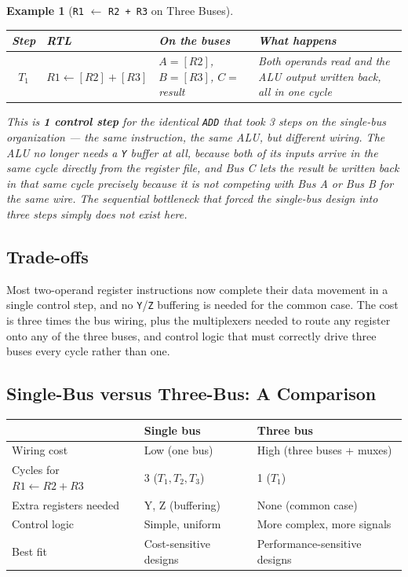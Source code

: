 \documentclass[11pt]{article}
\newtheorem{example}{Example}[section]
\begin{document}
\begin{example}[\texttt{R1} $\gets$ \texttt{R2 + R3} on Three Buses]
\begin{center}
\small
\begin{tabular}{@{}cp{3.6cm}p{3.0cm}p{4.6cm}@{}}
\toprule
\textbf{Step} & \textbf{RTL} & \textbf{On the buses} & \textbf{What happens} \\
\midrule
$T_1$ & $R1 \gets [R2] + [R3]$ & $A = [R2]$, $B = [R3]$, $C = $result & Both operands read \emph{and} the ALU output written back, all in one cycle \\
\bottomrule
\end{tabular}
\end{center}
This is \textbf{1 control step} for the identical \texttt{ADD} that took 3 steps on the single-bus organization --- the same instruction, the same ALU, but different wiring. The ALU no longer needs a \texttt{Y} buffer at all, because both of its inputs arrive in the same cycle directly from the register file, and Bus C lets the result be written back in that same cycle precisely because it is not competing with Bus A or Bus B for the same wire. The sequential bottleneck that forced the single-bus design into three steps simply does not exist here.
\end{example}

\subsection{Trade-offs}

Most two-operand register instructions now complete their data movement in a single control step, and no \texttt{Y}/\texttt{Z} buffering is needed for the common case. The cost is three times the bus wiring, plus the multiplexers needed to route any register onto any of the three buses, and control logic that must correctly drive three buses every cycle rather than one.

\subsection{Single-Bus versus Three-Bus: A Comparison}

\begin{center}
\small
\begin{tabular}{@{}p{3.0cm}p{4.2cm}p{4.2cm}@{}}
\toprule
 & \textbf{Single bus} & \textbf{Three bus} \\
\midrule
Wiring cost & Low (one bus) & High (three buses + muxes) \\
Cycles for $R1 \gets R2{+}R3$ & 3 ($T_1, T_2, T_3$) & 1 ($T_1$) \\
Extra registers needed & Y, Z (buffering) & None (common case) \\
Control logic & Simple, uniform & More complex, more signals \\
Best fit & Cost-sensitive designs & Performance-sensitive designs \\
\bottomrule
\end{tabular}
\end{center}
\end{document}

